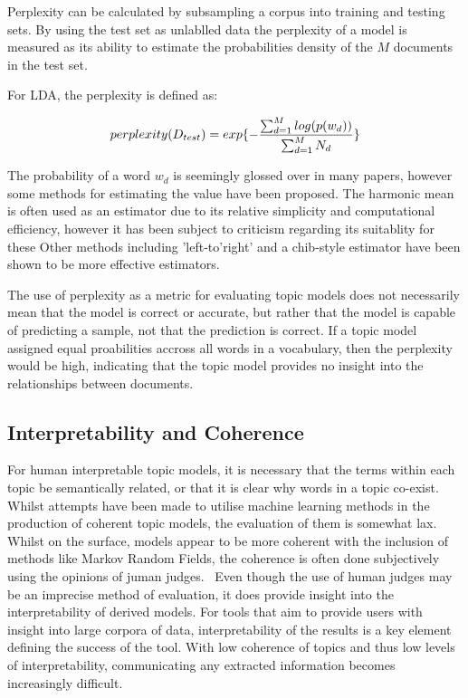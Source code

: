 \documentclass[10pt]{report}
\begin{document}
Perplexity can be calculated by subsampling a corpus into training and testing sets. By using the test set as unlablled data the perplexity of a model is measured as its ability to estimate the probabilities density of the \(M\) documents in the test set.

\renewcommand{\baselinestretch}{1.0}\normalsize
For LDA, the perplexity is defined as:

\[
  perplexity(D_{test}) = exp\{-{{\sum^{M}_{d=1} log(p(w_d))}\over{\sum^{M}_{d=1} N_d}}\}
\]

\renewcommand{\baselinestretch}{2.0}\normalsize
The probability of a word \(w_d\) is seemingly glossed over in many papers, however some methods for estimating the value have been proposed. The harmonic mean is often used as an estimator due to its relative simplicity and computational efficiency, however it has been subject to criticism regarding its suitablity for these Other methods including 'left-to'right' and a chib-style estimator have been shown to be more effective estimators.~\cite{Newton1994-ws,Wallach2008-ti,Chib1995-wq,Wallach2009-ot}

The use of perplexity as a metric for evaluating topic models does not necessarily mean that the model is correct or accurate, but rather that the model is capable of predicting a sample, not that the prediction is correct. If a topic model assigned equal proabilities accross all words in a vocabulary, then the perplexity would be high, indicating that the topic model provides no insight into the relationships between documents.

\subsection{Interpretability and Coherence}
For human interpretable topic models, it is necessary that the terms within each topic be semantically related, or that it is clear why words in a topic co-exist. Whilst attempts have been made to utilise machine learning methods in the production of coherent topic models, the evaluation of them is somewhat lax. Whilst on the surface, models appear to be more coherent with the inclusion of methods like Markov Random Fields, the coherence is often done subjectively using the opinions of juman judges.~\cite{Xie2015-wv} Even though the use of human judges may be an imprecise method of evaluation, it does provide insight into the interpretability of derived models. For tools that aim to provide users with insight into large corpora of data, interpretability of the results is a key element defining the success of the tool. With low coherence of topics and thus low levels of interpretability, communicating any extracted information becomes increasingly difficult.
\end{document}
